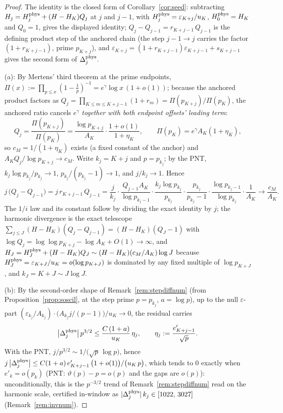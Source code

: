 \documentclass[11pt]{article}
\theoremstyle{remark}
\newcommand{\eps}{\varepsilon}
\newcommand{\gam}{\gamma}
\begin{document}
\begin{proof}
The identity is the closed form of Corollary~\ref{cor:seed}:
subtracting $H_j=H^{\rm phys}_j+(H-H_K)Q_j$ at $j$ and $j-1$, with
$H^{\rm phys}_j=\eps_{K+j}/u_K$, $H^{\rm phys}_0=H_K$ and $Q_0=1$,
gives the displayed identity; $Q_j-Q_{j-1}=r_{K+j-1}\,Q_{j-1}$ is the
defining product step of the anchored chain (the step $j-1\to j$
carries the factor $(1+r_{K+j-1})$, prime $p_{K+j}$), and
$\eps_{K+j}=(1+r_{K+j-1})\eps_{K+j-1}+s_{K+j-1}$ gives the second form
of $\Delta^{\rm phys}_j$.

(a): By Mertens' third theorem at the prime endpoints,
$\Pi(x):=\prod_{p\le x}(1-\tfrac1p)^{-1}=e^{\gam}\log x\,(1+o(1))$;
because the anchored product factors as
$Q_j=\prod_{K\le m\le K+j-1}(1+r_m)=\Pi(p_{K+j})/\Pi(p_K)$, the
anchored ratio cancels $e^{\gam}$ \emph{together with both endpoint
offsets' leading term}:
\[
Q_j=\frac{\Pi(p_{K+j})}{\Pi(p_K)}
=\frac{\log p_{K+j}}{A_K}\cdot\frac{1+o(1)}{1+\eta_K},
\qquad \Pi(p_K)=e^{\gam}A_K(1+\eta_K),
\]
so $c_M=1/(1+\eta_K)$ exists (a fixed constant of the anchor) and
$A_KQ_j/\log p_{K+j}\to c_M$. Write $k_j=K+j$ and $p=p_{k_j}$; by the
PNT, $k_j\log p_{k_j}/p_{k_j}\to1$, $p_{k_j}/(p_{k_j}-1)\to1$, and
$j/k_j\to1$. Hence
\[
j\,\bigl(Q_j-Q_{j-1}\bigr)
=j\,r_{K+j-1}\,Q_{j-1}
=\frac{j}{k_j}\cdot\frac{Q_{j-1}A_K}{\log p_{k_j-1}}\cdot
\frac{k_j\log p_{k_j}}{p_{k_j}}
\cdot\frac{p_{k_j}}{p_{k_j}-1}
\cdot\frac{\log p_{k_j-1}}{\log p_{k_j}}\cdot\frac1{A_K}
\longrightarrow\frac{c_M}{A_K}.
\]
The $1/i$ law and its constant follow by dividing the exact identity
by $j$; the harmonic divergence is the exact telescope
$\sum_{j\le J}(H-H_K)(Q_j-Q_{j-1})=(H-H_K)(Q_J-1)$ with
$\log Q_j=\log\log p_{K+j}-\log A_K+O(1)\to\infty$, and
$H_J=H^{\rm phys}_J+(H-H_K)Q_J\sim(H-H_K)(c_M/A_K)\log J$ because
$H^{\rm phys}_J=\eps_{K+J}/u_K=o(\log p_{K+J})$ is dominated by any
fixed multiple of $\log p_{K+J}$, and $k_J=K+J\sim J\log J$.

(b): By the second-order shape of Remark~\ref{rem:stepdiffnum} (from
Proposition~\ref{prop:soscil}, at the step prime $p=p_{k_j}$,
$a=\log p$), up to the null $\eps$-part
$(\eps_{k_j}/A_{k_j})\cdot\bigl(A_{k_j}j/(p-1)\bigr)/u_K\to0$, the
residual carries
\[
\bigl|\Delta^{\rm phys}_j\bigr|\,p^{3/2}
\le\frac{C\,(1+a)}{u_K}\,\eta_j,
\qquad \eta_j:=\frac{e'_{K+j-1}}{\sqrt p}.
\]
With the PNT, $j/p^{3/2}\sim1/\bigl(\sqrt p\,\log p\bigr)$, hence
$j\,\bigl|\Delta^{\rm phys}_j\bigr|
\le C(1+a)\,e'_{K+j-1}\,\bigl(1+o(1)\bigr)/\bigl(u_K\,p\bigr)$, which
tends to $0$ exactly when $e'_k=o(p_k)$ (PNT:
$\vartheta(p)-p=o(p)$ and the gaps are $o(p)$): unconditionally, this
is the $p^{-3/2}$ trend of Remark~\ref{rem:stepdiffnum} read on the
harmonic scale, certified in-window as
$|\Delta^{\rm phys}_j|\,k_j\in[1022,\,3027]$
(Remark~\ref{rem:invnum}).
\end{proof}
\end{document}
